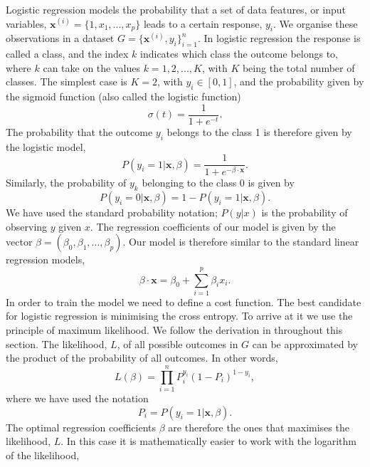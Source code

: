 \documentclass[a4paper,
amsfonts,
amssymb,
amsmath,
reprint,
showkeys,
nofootinbib,
twoside]{revtex4-2}
\begin{document}
Logistic regression models the probability that a set of data features, or input variables, $\bm{x}^{(i)} = \{1, x_1, ... ,x_p\}$ leads to a certain response, $y_i$. We organise these observations in a  dataset $G = \{\mathbf{x}^{(i)}, y_i\}_{i = 1}^n$. In logistic regression the response is called a class, and the index $k$ indicates which class the outcome belongs to, where $k$ can take on the values $k = 1, 2, ... , K$, with $K$ being the total number of classes. The simplest case is $K = 2$, with $y_i \in [0, 1]$, and the probability given by the sigmoid function (also called the logistic function)
\begin{equation}
    \sigma(t) = \frac{1}{1 + e^{-t}}.
    \label{eq:sigmoid}
\end{equation}
The probability that the outcome $y_i$ belongs to the class 1 is therefore given by the logistic model,
\begin{equation}
    P(y_i = 1 \vert \bm{x}, \beta) = \frac{1}{1 + e^{-\beta \cdot \bm{x}}}.
\end{equation}
Similarly, the probability of $y_k$ belonging to the class 0 is given by
\begin{equation}
     P(y_i = 0 \vert \bm{x}, \beta) = 1 - P(y_i = 1 \vert \bm{x}, \beta).
\end{equation}
We have used the standard probability notation; $P(y\vert x)$ is the probability of observing $y$ given $x$.
The regression coefficients of our model is given by the vector $\beta = (\beta_0, \beta_1, ..., \beta_p)$. Our model is therefore similar to the standard linear regression models,
\begin{equation}
    \beta \cdot \bm{x} = \beta_0 + \sum_{i = 1}^p \beta_i x_i.
\end{equation}
In order to train the model we need to define a cost function. The best candidate for logistic regression is minimising the cross entropy. To arrive at it we use the principle of maximum likelihood. We follow the derivation in \cite[page 120]{Hastie} throughout this section. The likelihood, $L$, of all possible outcomes in $G$ can be approximated by the product of the probability of all outcomes. In other words,
\begin{equation}
    L(\beta) = \prod_{i = 1}^n P_i^{y_i}(1 - P_i)^{1 - y_i},
\end{equation}
where we have used the notation
\begin{equation}
    P_i = P(y_i = 1 \vert \bm{x}, \beta).
\end{equation}
The optimal regression coefficients $\beta$ are therefore the ones that maximises the likelihood, $L$. In this case it is mathematically easier to work with the logarithm of the likelihood,
\end{document}

